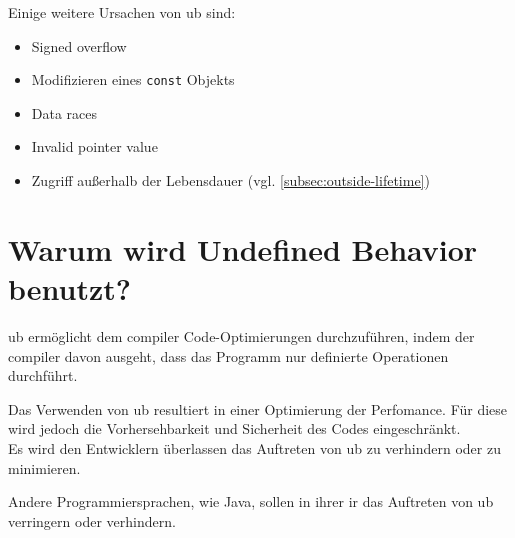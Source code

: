 Einige weitere Ursachen von \gls{ub} sind:
\begin{itemize}
    \item Signed overflow \cite[S.74]{book:cpp-standard}
    \item Modifizieren eines \verb|const| Objekts \cite[S.174]{book:cpp-standard}
    \item Data races \cite[S.1376]{book:cpp-standard}
    \item Invalid pointer value \cite[S.67]{book:cpp-standard}
    \item Zugriff außerhalb der Lebensdauer \cite[S.35]{book:cpp-standard} (vgl. \ref{subsec:outside-lifetime})
\end{itemize}

\section{Warum wird Undefined Behavior benutzt?}
\label{sec:ub_warum}

\gls{ub} ermöglicht dem \gls{compiler} Code-Optimierungen durchzuführen, indem der \gls{compiler} davon ausgeht, dass das Programm nur definierte Operationen durchführt. \cite[S.633]{book:taming-ub}

Das Verwenden von \gls{ub} resultiert in einer Optimierung der Perfomance. Für diese wird jedoch die Vorhersehbarkeit und Sicherheit des Codes eingeschränkt. \cite[S.633]{book:taming-ub} \\
Es wird den Entwicklern überlassen das Auftreten von \gls{ub} zu verhindern oder zu minimieren.

Andere Programmiersprachen, wie Java, sollen in ihrer \gls{ir} das Auftreten von \gls{ub} verringern oder verhindern. \cite[S.633]{book:taming-ub}